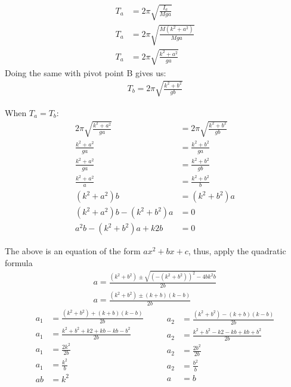 \documentclass{report}
\begin{document}
\begin{align}
    T_a&=2\pi \sqrt{\frac{I_a}{Mga}}\nonumber\\
    T_a&=2\pi \sqrt{\frac{M(k^2+a^2)}{ Mga }}\nonumber\\
    T_a&=2\pi \sqrt{\frac{k^2+a^2}{ga}} \label{eq:perioda}
\end{align}
Doing the same with pivot point B gives us:
\begin{gather}
    T_b=2\pi \sqrt{\frac{k^2+b^2}{gb}}\label{eq:periodb}
\end{gather}

When $T_a = T_b$:  
\begin{align*}
    2\pi \sqrt{\frac{k^2+a^2}{ga}}&=2\pi \sqrt{\frac{k^2+b^2}{gb}}\\
    \frac{k^2+a^2}{ ga }&= \frac{ k^2+b^2 }{ ga }\\
    \frac{ k^2+a^2 }{ ga }&= \frac{ k^2+b^2 }{ gb }\\
    \frac{ k^2+a^2 }{ a }&= \frac{ k^2+b^2 }{ b }\\
    (k^2+a^2)b &=(k^2+b^2)a \\
    (k^2+a^2)b-(k^2+b^2)a &= 0\\
    a^2b-(k^2+b^2)a + k2b &=0
\end{align*}

The above is an equation of the form $ax^2+bx+c$, thus, apply the quadratic formula
\begin{gather*}
    a= \frac{\left(k^2+b^2\right)\pm \sqrt{\left(-\left(k^2+b^2\right)\right)^2-4bk^2b}}{2b}\\
    a= \frac{\left(k^2+b^2\right)\pm \left(k+b\right)\left(k-b\right)}{ 2b }
\end{gather*}
\begin{equation}
    \begin{split}
        a_1 &= \frac{ (k^2+b^2)+ (k+b)(k-b) }{2b}\\
        a_1 &= \frac{ k^2+b^2+k2+kb-kb-b^2 }{2b} \\
        a_1 &= \frac{2k^2}{2b}\\
        a_1 &= \frac{k^2}{b}\\
        ab &= k^2 \label{eq:solve1} 
    \end{split}
    \qquad
    \begin{split}
        a_2 &= \frac{ (k^2+b^2)- (k+b)(k-b) }{ 2b } \\
        a_2 &= \frac{ k^2+b^2-k2-kb+kb+b^2 }{ 2b }   \\
        a_2 &= \frac{ 2b^2} { 2b }                    \\
        a_2 &= \frac{b^2}{ b }                      \\
        a &=b                          
    \end{split}
\end{equation}
\end{document}
